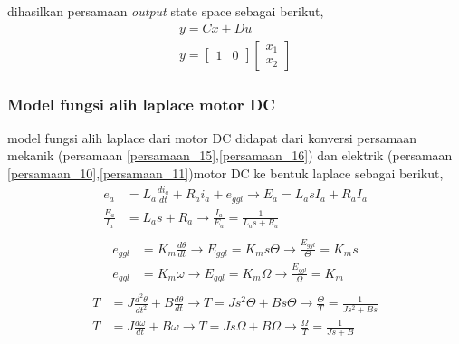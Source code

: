 \documentclass[../cover.tex]{subfiles}
\begin{document}
            dihasilkan persamaan \textit{output} state space sebagai berikut,
            \begin{equation}
                \begin{split}
                    y = Cx + Du \\[5pt]
                    y = \begin{bmatrix} 1 & 0 \end{bmatrix} \begin{bmatrix} x_1 \\ x_2 \end{bmatrix}
                \end{split}
            \end{equation}
        \subsubsection{Model fungsi alih laplace motor DC}
            model fungsi alih laplace dari motor DC didapat dari konversi persamaan mekanik (persamaan \eqref{persamaan_15},\eqref{persamaan_16}) dan elektrik (persamaan \eqref{persamaan_10},\eqref{persamaan_11})motor DC ke bentuk laplace sebagai berikut,
            \begin{equation}
                \begin{split}
                    e_a &= L_a \frac{di_a}{dt} + R_a i_a + e_{ggl} \rightarrow E_a = L_a s I_a + R_a I_a \\[5pt]
                    \frac{E_a}{I_a} &= L_a s + R_a \rightarrow \frac{I_a}{E_a} = \frac{1}{L_a s + R_a}\\[10pt]
                \end{split}
            \end{equation}
            \begin{equation}
                \begin{split}
                    e_{ggl} &= K_m\frac{d\theta}{dt} \rightarrow E_{ggl} = K_m s \Theta \rightarrow \frac{E_{ggl}}{\Theta} = K_m s \\[5pt]
                    e_{ggl} &= K_m\omega \rightarrow E_{ggl} = K_m\Omega \rightarrow \frac{E_{ggl}}{\Omega} = K_m \\[10pt]
                \end{split}
            \end{equation}
            \begin{equation}
                \begin{split}
                    T &= J\frac{d^2\theta}{dt^2} + B\frac{d\theta}{dt} \rightarrow T = Js^2\Theta + Bs\Theta \rightarrow \frac{\Theta}{T} = \frac{1}{Js^2 + Bs} \\[5pt]
                    T &= J\frac{d\omega}{dt} + B\omega \rightarrow T = Js\Omega + B\Omega \rightarrow \frac{\Omega}{T} = \frac{1}{Js + B} \\[10pt]
                \end{split}
            \end{equation}
\end{document}
